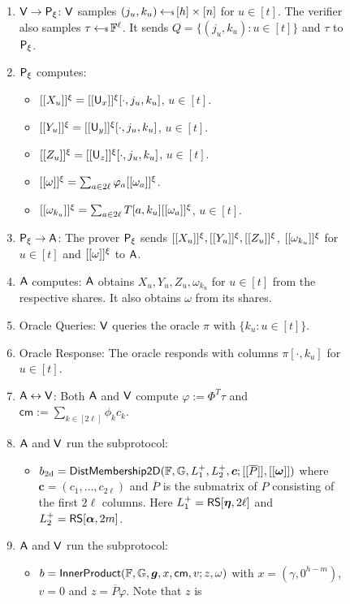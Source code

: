 \begin{figure}[h!]
\begin{framed}
\begin{itemize}
\begin{enumerate}[{\rm 1.}]
\item $\mathsf{V}\rightarrow\mathsf{P}_\xi$: $\mathsf{V}$ samples $(j_u,k_u)\hskip2.3pt{\gets\!\!\mbox{\tiny${\$}$\normalsize}}\,
[h]\times [n]$ for $u\in [t]$. The verifier also samples $\tau\hskip2.3pt{\gets\!\!\mbox{\tiny${\$}$\normalsize}}\,
\mathbb{F}^{\ell}$. It sends $Q=\{(j_u,k_u):u\in [t]\}$ and $\tau$ to $\mathsf{P}_\xi$.
\item $\mathsf{P}_\xi$ computes:
	\begin{itemize}
	\item $[[{X_u}]]^\xi=[[{\mathsf{U}_x}]]^\xi[\cdot,j_u,k_u]$, $u\in [t]$.
	\item $[[{Y_u}]]^\xi=[[{\mathsf{U}_y}]]^\xi[\cdot,j_u,k_u]$, $u\in [t]$.
	\item $[[{Z_u}]]^\xi=[[{\mathsf{U}_z}]]^\xi[\cdot,j_u,k_u]$, $u\in [t]$.
	\item $[[{\omega}]]^\xi=\sum_{a\in 2\ell}\varphi_a[[{\omega_a}]]^\xi$.
	\item $[[{\omega_{k_u}}]]^\xi=\sum_{a\in 2\ell}T[a,k_u][[{\omega_a}]]^\xi$,
$u\in [t]$.
	\end{itemize}
\item $\mathsf{P}_\xi\rightarrow\mathsf{A}$: The prover $\mathsf{P}_\xi$ sends
$[[{X_u}]]^\xi,[[{Y_u}]]^\xi,[[{Z_u}]]^\xi$, $[[{\omega_{k_u}}]]^\xi$ for $u\in [t]$ and
$[[{\omega}]]^\xi$ to $\mathsf{A}$.
\item $\mathsf{A}$ computes: $\mathsf{A}$ obtains $X_u,Y_u,Z_u,\omega_{k_u}$ for $u\in [t]$
from the respective shares. It also obtains $\omega$ from its shares. 
\item Oracle Queries: $\mathsf{V}$ queries the oracle $\pi$ with $\{k_u: u\in
[t]\}$.
\item Oracle Response: The oracle responds with columns $\pi[\cdot,k_u]$ for
$u\in [t]$.
\item $\mathsf{A}\leftrightarrow\mathsf{V}$: Both $\mathsf{A}$ and $\mathsf{V}$ compute
$\varphi := \Phi^T\tau$ and $\mathsf{cm}:= \sum_{k\in [2\ell]}\phi_kc_k$.
\item $\mathsf{A}$ and $\mathsf{V}$ run the subprotocol:
	\begin{itemize}
	\item $b_{\rm
2d}=\mathsf{DistMembership2D}(\mathbb{F},\mathbb{G},L^{+}_1,L^{+}_2,\bm{c};[[\overline{P}]],[[\bm{\omega}]])$ where
$\bm{c}=(c_1,\ldots,c_{2\ell})$ and $\overline{P}$ is the submatrix of $P$ consisting
of the first $2\ell$ columns. Here $L^{+}_1=\mathsf{RS}[\bm{\eta},2\ell]$ and
$L^{+}_2=\mathsf{RS}[\bm{\alpha},2m]$.
	\end{itemize}
\item $\mathsf{A}$ and $\mathsf{V}$ run the subprotocol:
	\begin{itemize}
	\item $b=\mathsf{InnerProduct}(\mathbb{F},\mathbb{G},\bm{g},x,\mathsf{cm},v;z,\omega)$
with $x=(\gamma,0^{h-m})$, $v=0$ and $z=\overline{P}\varphi$. Note that $z$ is

\end{itemize}
\end{enumerate}
\end{itemize}
\end{framed}
\end{figure}
